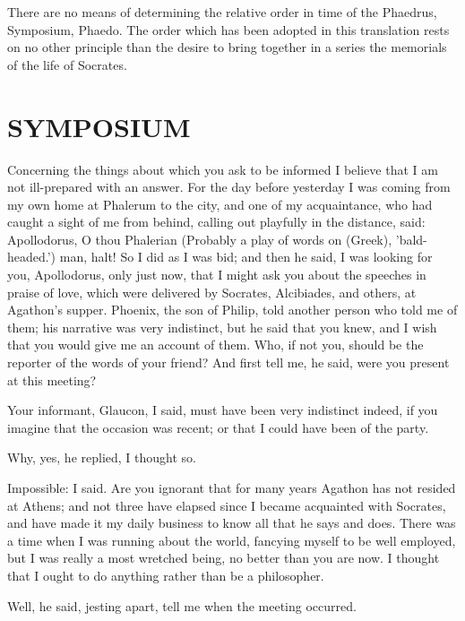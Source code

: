 \documentclass[11pt,letter]{article}
\begin{document}
\par  There are no means of determining the relative order in time of the Phaedrus, Symposium, Phaedo. The order which has been adopted in this translation rests on no other principle than the desire to bring together in a series the memorials of the life of Socrates.

\par 
\section{
      SYMPOSIUM
    }  
\par  Concerning the things about which you ask to be informed I believe that I am not ill-prepared with an answer. For the day before yesterday I was coming from my own home at Phalerum to the city, and one of my acquaintance, who had caught a sight of me from behind, calling out playfully in the distance, said: Apollodorus, O thou Phalerian (Probably a play of words on (Greek), 'bald-headed.') man, halt! So I did as I was bid; and then he said, I was looking for you, Apollodorus, only just now, that I might ask you about the speeches in praise of love, which were delivered by Socrates, Alcibiades, and others, at Agathon's supper. Phoenix, the son of Philip, told another person who told me of them; his narrative was very indistinct, but he said that you knew, and I wish that you would give me an account of them. Who, if not you, should be the reporter of the words of your friend? And first tell me, he said, were you present at this meeting?

\par  Your informant, Glaucon, I said, must have been very indistinct indeed, if you imagine that the occasion was recent; or that I could have been of the party.

\par  Why, yes, he replied, I thought so.

\par  Impossible: I said. Are you ignorant that for many years Agathon has not resided at Athens; and not three have elapsed since I became acquainted with Socrates, and have made it my daily business to know all that he says and does. There was a time when I was running about the world, fancying myself to be well employed, but I was really a most wretched being, no better than you are now. I thought that I ought to do anything rather than be a philosopher.

\par  Well, he said, jesting apart, tell me when the meeting occurred.
\end{document}
